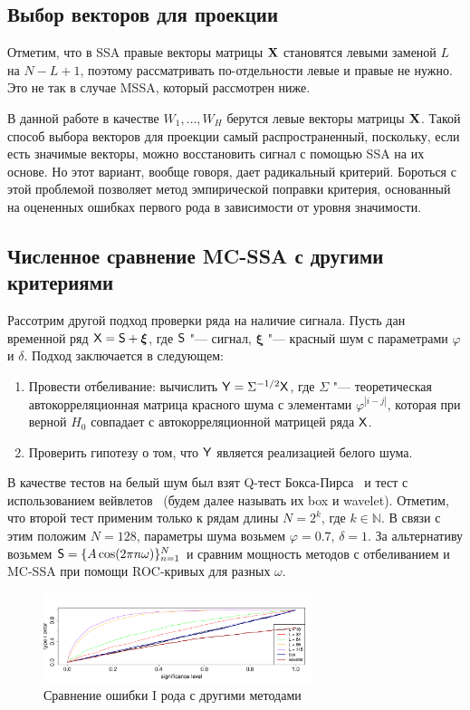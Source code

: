 \documentclass[specialist,
substylefile = spbu_report.rtx,
subf,href,colorlinks=true, 12pt]{disser}
\theoremstyle{definition}
\newcommand{\bfxi}{\boldsymbol{\xi}}
\begin{document}
\subsection{Выбор векторов для проекции}\label{sect:vectors_choise}
Отметим, что в SSA правые векторы матрицы $\mathbf{X}$ становятся левыми заменой $L$ на $N-L+1$, поэтому рассматривать по-отдельности левые и правые не нужно. Это не так в случае MSSA, который рассмотрен ниже.

В данной работе в качестве $W_1, \ldots,W_H$ берутся левые векторы матрицы $\mathbf{X}$. Такой способ выбора векторов для проекции самый распространенный, поскольку, если есть значимые векторы, можно восстановить сигнал с помощью SSA на их основе. Но этот вариант, вообще говоря, дает радикальный критерий. Бороться с этой проблемой позволяет метод эмпирической поправки критерия, основанный на оцененных ошибках первого рода в зависимости
от уровня значимости. 


\subsection{Численное сравнение MC-SSA с другими критериями}\label{sect:mc-ssa_comparison}
Рассотрим другой подход проверки ряда на наличие сигнала. Пусть дан временной ряд $\tX=\tS+\bfxi$, где $\mathsf{S}$ "--- сигнал, $\bfxi$ "--- красный шум с параметрами $\varphi$ и $\delta$. Подход заключается в следующем:
\begin{enumerate}
	\item Провести отбеливание: вычислить $\mathsf{Y}=\Sigma^{-1/2}\mathsf{X}$, где $\Sigma$ "--- теоретическая автокорреляционная матрица красного шума с элементами $\varphi^{|i-j|}$, которая при верной $H_0$ совпадает с автокорреляционной матрицей ряда $\mathsf{X}$.
	\item Проверить гипотезу о том, что $\mathsf{Y}$ является реализацией белого шума.
\end{enumerate} 
В качестве тестов на белый шум был взят Q-тест Бокса-Пирса~\cite{box-pierce} и тест с использованием вейвлетов~\cite{wavelet} (будем далее называть их box и wavelet). Отметим, что второй тест применим только к рядам длины $N=2^k$, где $k\in\mathbb{N}$. В связи с этим положим $N=128$, параметры шума возьмем $\varphi=0.7$, $\delta=1$. За альтернативу возьмем $\mathsf{S}=\{A\cos(2\pi n\omega)\}_{n=1}^N$ и сравним мощность методов с отбеливанием и MC-SSA при помощи ROC-кривых для разных $\omega$.

\begin{figure}[h!]
	\centering
	\includegraphics[width=0.7\textwidth]{img/alphaI_testAR.pdf}
	\caption{Сравнение ошибки I рода с другими методами}
	\label{alphaI_testAR}
\end{figure}
\end{document}
